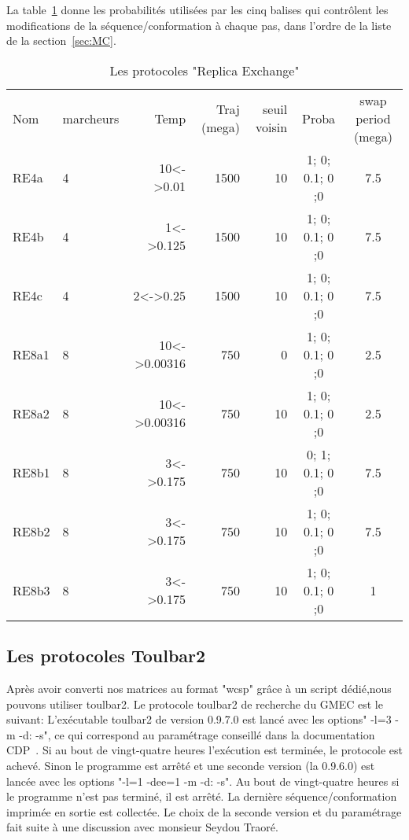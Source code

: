 La table~\ref{tab:protoRE} donne les probabilités utilisées par les cinq balises qui contrôlent les modifications de la séquence/conformation à chaque pas, dans l'ordre de la liste de la section~\ref{sec:MC}. 
    
    \begin{table}[!htbp]
      \centering

      \begin{tabular}{llrrrcc}

        \toprule
        Nom & marcheurs &Temp & Traj (mega)& seuil voisin  & Proba & swap period (mega)\\
        \cmidrule{1-7}
        RE4a   & 4 & 10<->0.01    &  1500 & 10 & 1; 0; 0.1; 0 ;0 &  7.5\\  
        RE4b   & 4 & 1<->0.125    &  1500 & 10 & 1; 0; 0.1; 0 ;0 &  7.5\\  
        RE4c   & 4 & 2<->0.25     &  1500 & 10 & 1; 0; 0.1; 0 ;0 &  7.5\\  
        RE8a1  & 8 & 10<->0.00316 &  750  & 0  & 1; 0; 0.1; 0 ;0 &  2.5\\  
        RE8a2  & 8 & 10<->0.00316 &  750  & 10 & 1; 0; 0.1; 0 ;0 &  2.5\\  
        RE8b1  & 8 & 3<->0.175    &  750  & 10 & 0; 1; 0.1; 0 ;0 &  7.5\\
        RE8b2  & 8 & 3<->0.175    &  750  & 10 & 1; 0; 0.1; 0 ;0 &  7.5\\
        RE8b3  & 8 & 3<->0.175    &  750  & 10 & 1; 0; 0.1; 0 ;0 &  1\\
        \bottomrule

      \end{tabular}      
      \caption{Les protocoles "Replica Exchange"}
\label{tab:protoRE}      
    \end{table}

   \subsection{Les protocoles Toulbar2} 


Après avoir converti nos matrices au format "wcsp" grâce à un script dédié,nous pouvons utiliser toulbar2.
Le protocole toulbar2 de recherche du GMEC est le suivant:
L'exécutable toulbar2 de version 0.9.7.0 est lancé avec les options" -l=3 -m -d: -s", ce qui correspond au paramétrage conseillé dans la documentation CDP~\citep{reftoulbar1,reftoulbar2}. Si au bout de vingt-quatre heures l'exécution est terminée, le protocole est achevé. Sinon le programme est arrêté et une seconde version (la 0.9.6.0) est lancée avec les options "-l=1 -dee=1 -m -d: -s". Au bout de vingt-quatre heures si le programme n'est pas terminé, il est arrêté. La dernière séquence/conformation imprimée en sortie est collectée. Le choix de la seconde version et du paramétrage fait suite à une discussion avec monsieur Seydou Traoré.  


